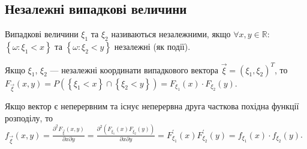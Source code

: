 \subsection{Незалежні випадкові величини}
\begin{definition}
    Випадкові величини $\xi_1$ та $\xi_2$ називаються незалежними, якщо 
    $\forall x, y \in \mathbb{R}$:  
    $\left\{\omega:\xi_1 < x\right\}$ та $\left\{\omega:\xi_2 < y\right\}$ 
    незалежні (як події).
\end{definition}
    Якщо $\xi_1$, $\xi_2$ --- незалежні координати випадкового вектора $\vec{\xi} = (\xi_1, \xi_2)^T$, 
    то $F_{\vec{\xi}}(x, y) = 
    P\left(\left\{\xi_1 < x\right\} \cap \left\{\xi_2 < y\right\}\right) = 
    F_{\xi_1}(x)\cdot F_{\xi_2}(y)$.

    Якщо вектор є неперервним та існує неперервна 
    друга часткова похідна функції розподілу, то
    $f_{\vec{\xi}}(x, y) = \frac{\partial^2 F_{\vec{\xi}}(x, y)}
    {\partial x \partial y} = \frac{\partial^2(F_{\xi_1}(x)F_{\xi_2}(y))}{\partial x \partial y} 
    = F_{\xi_1}^\prime (x)F_{\xi_2}^\prime (y) = 
    f_{\xi_1}(x)\cdot f_{\xi_2}(y)$.